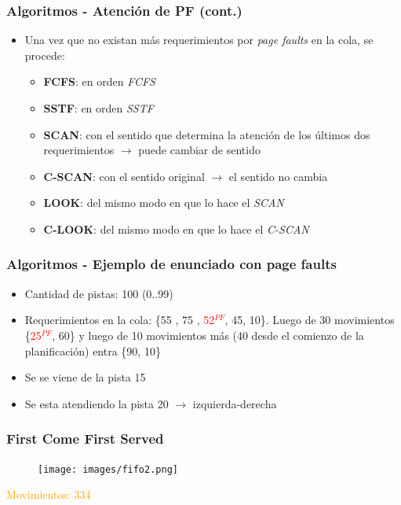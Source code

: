 \begin{frame}
  \frametitle{Algoritmos - Atención de \textbf{PF (cont.)}}
  \begin{itemize}
    \item Una vez que no existan más requerimientos por \textit{page faults} en la cola, se procede:
    \begin{itemize}
      \item \textbf{FCFS}: en orden \textit{FCFS}
      \item \textbf{SSTF}: en orden \textit{SSTF}
      \item \textbf{SCAN}: con el sentido que determina la atención de los últimos dos requerimientos $\rightarrow$ puede cambiar de sentido
      \item \textbf{C-SCAN}: con el sentido original $\rightarrow$ el sentido no cambia
      \item \textbf{LOOK}: del mismo modo en que lo hace el \textit{SCAN}
      \item \textbf{C-LOOK}: del mismo modo en que lo hace el \textit{C-SCAN}
    \end{itemize}
  \end{itemize}
\end{frame}

\begin{frame}
  \frametitle{Algoritmos - Ejemplo de enunciado con \textbf{page faults}}
  \begin{itemize}
    \item Cantidad de pistas: 100 (0..99)
    \item Requerimientos en la cola: \{55 , 75 , \textcolor{red}{52$^{PF}$}, 45, 10\}. Luego de 30 movimientos \{\textcolor{red}{25$^{PF}$}, 60\} y luego de 10 movimientos más (40 desde el comienzo de la planificación) entra \{90, 10\}
    \item Se se viene de la pista 15
    \item Se esta atendiendo la pista 20 $\rightarrow$ izquierda-derecha
  \end{itemize}
\end{frame}

\begin{frame}
  \frametitle{\textbf{First Come First Served}}
  \begin{figure}
    \texttt{[image: images/fifo2.png]}
  \end{figure}
  \hspace{35pt} \textcolor{orange}{Movimientos: 334}
\end{frame}

